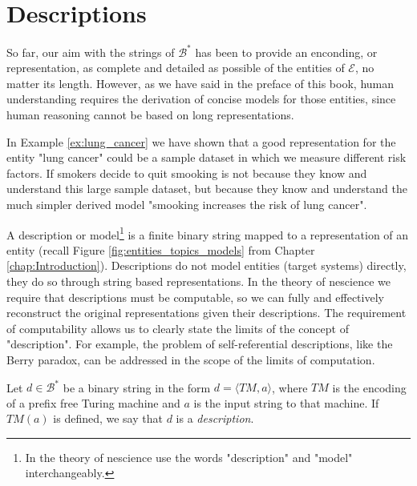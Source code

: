%
%

\section{Descriptions}
\label{sec:descriptions_models}

So far, our aim with the strings of $\mathcal{B}^\ast$ has been to provide an enconding, or representation, as complete and detailed as possible of the entities of $\mathcal{E}$, no matter its length. However, as we have said in the preface of this book, human understanding requires the derivation of concise models for those entities, since human reasoning cannot be based on long representations.

\begin{example}
In Example \ref{ex:lung_cancer} we have shown that a good representation for the entity "lung cancer" could be a sample dataset in which we measure different risk factors. If smokers decide to quit smooking is not because they know and understand this large sample dataset, but because they know and understand the much simpler derived model "smooking increases the risk of lung cancer".
\end{example}

A description or model\footnote{In the theory of nescience use the words "description" and "model" interchangeably.} is a finite binary string mapped to a representation of an entity (recall Figure \ref{fig:entities_topics_models} from Chapter \ref{chap:Introduction}). Descriptions do not model entities (target systems) directly, they do so through string based representations. In the theory of nescience we require that descriptions must be computable, so we can fully and effectively reconstruct the original representations given their descriptions. The requirement of computability allows us to clearly state the limits of the concept of "description". For example, the problem of self-referential descriptions, like the Berry paradox, can be addressed in the scope of the limits of computation.

\begin{definition} [Model]
\label{def:descriptions_model}
Let $d \in \mathcal{B}^\ast$ be a binary string in the form $d = \langle TM,a \rangle$, where $TM$ is the encoding of a prefix free Turing machine and $a$ is the input string to that machine. If $TM(a)$ is defined, we say that $d$ is a \emph{description}. 
\end{definition}

